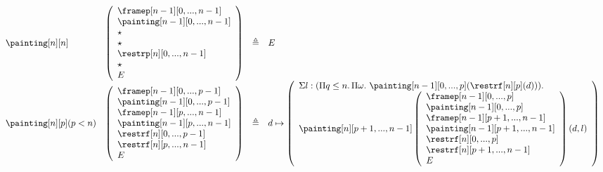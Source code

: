 \documentclass{msc}
\newcommand{\defeq}{\ensuremath{\triangleq}}
\begin{document}
\begin{itemize}
$$\begin{array}{llcl}
            \painting[n][n]              &
            \left(\begin{array}{l}
                      \framep[n-1][0,...,n-1]   \\
                      \painting[n-1][0,...,n-1] \\
                      \star                     \\
                      \star                     \\
                      \restrp[n][0,...,n-1]     \\
                      \star                     \\
                      E                         \\
                    \end{array}\right) & \defeq & E                        \\
            \painting[n][p](p<n)         &
            \left(\begin{array}{l}
                      \framep[n-1][0,...,p-1]   \\
                      \painting[n-1][0,...,p-1] \\
                      \framep[n-1][p,...,n-1]   \\
                      \painting[n-1][p,...,n-1] \\
                      \restrf[n][0,...,p-1]     \\
                      \restrf[n][p,...,n-1]     \\
                      E                         \\
                    \end{array}\right) & \defeq & d \mapsto
            \left(\begin{array}{l}
                      \Sigma l:(\Pi q\leq n.\,\Pi \omega.\
                      \painting[n-1][0,...,p](\restrf[n][p](d))). \\
                      \painting[n][p+1,...,n-1]
                      \left(\begin{array}{l}
                          \framep[n-1][0,...,p]       \\
                          \painting[n-1][0,...,p]     \\
                          \framep[n-1][p+1,...,n-1]   \\
                          \painting[n-1][p+1,...,n-1] \\
                          \restrf[n][0,...,p]         \\
                          \restrf[n][p+1,...,n-1]     \\
                          E                           \\
                        \end{array}\right)(d,l)           \\
                    \end{array}\right) \\
          \end{array}
        $$


\end{itemize}
\end{document}

